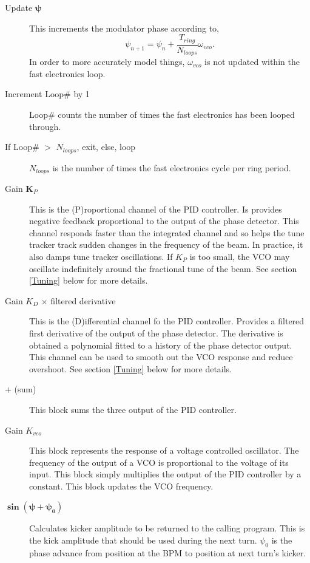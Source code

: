 \begin{description}
\item[Update $\boldsymbol{\psi}$] This increments the modulator phase according to,
\begin{equation}
\psi_{n+1}=\psi_n+\frac{T_{ring}}{N_{loops}}\omega_{vco}\textrm{.}
\end{equation}
In order to more accurately model things,
$\omega_{vco}$ is not updated within the fast electronics loop.

\item[Increment Loop\# by 1]  
Loop\# counts the number of times the fast electronics has been looped
through.

\item[If Loop\# $>$ $N_{loops}$, exit, else, loop]  
$N_{loops}$ is the number of times the fast electronics cycle per ring
period.

\item[Gain $\boldsymbol K_P$] 
This is the (P)roportional channel of the PID controller.  Is provides
negative feedback proportional to the output of the phase detector.
This channel responds faster than the integrated channel and so helps
the tune tracker track sudden changes in the frequency of the beam.
In practice, it also damps tune tracker oscillations.  If $K_P$ is too
small, the VCO may oscillate indefinitely around the fractional tune
of the beam.  See section \ref{Tuning} below for more details.

\item[Gain $K_D$ $\times$ filtered derivative]  
This is the (D)ifferential channel fo the PID controller.  Provides a
filtered first derivative of the output of the phase detector.  The
derivative is obtained a polynomial fitted to a history of the phase
detector output.  This channel can be used to smooth out the VCO
response and reduce overshoot.  See section \ref{Tuning} below for
more details.

\item[$\boldsymbol +$ (sum)]  
This block sums the three output of the PID controller.

\item[Gain $K_{vco}$] 
This block represents the response of a voltage controlled oscillator.
The frequency of the output of a VCO is proportional to the voltage of
its input.  This block simply multiplies the output of the PID
controller by a constant.  This block updates the VCO frequency.

\item[$\boldsymbol{\sin\left(\psi+\psi_0\right)}$]  
Calculates kicker amplitude to be returned to the calling program.
This is the kick amplitude that should be used during the next turn.
$\psi_0$ is the phase advance from position at the BPM to position at
next turn's kicker.

\end{description}


